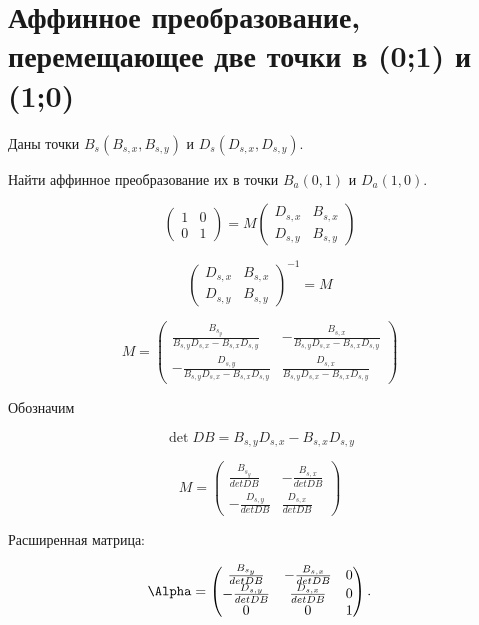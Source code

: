 \section{Аффинное преобразование, перемещающее две точки в (0;1) и (1;0)}

Даны точки $B_s(B_{s,x}, B_{s,y})$ и $D_s(D_{s,x}, D_{s,y})$.

Найти аффинное преобразование их в точки $B_a(0, 1)$ и $D_a(1, 0)$.

$$
\begin{pmatrix}
	1 & 0 \\
	0 & 1
\end{pmatrix}
= 
M
\begin{pmatrix}
	D_{s,x} & B_{s,x} \\
	D_{s,y} & B_{s,y}
\end{pmatrix}
$$

$$
\begin{pmatrix}
	D_{s,x} & B_{s,x} \\
	D_{s,y} & B_{s,y}
\end{pmatrix} ^ {-1}
= 
M
$$


$$
	M = 
	\begin{pmatrix}
		\frac{B_{s_y}}{B_{s,y} D_{s,x}-B_{s,x} D_{s,y}} & -\frac{B_{s,x}}{B_{s,y} D_{s,x}-B_{s,x} D_{s,y}}\\
		-\frac{D_{s,y}}{B_{s,y} D_{s,x}-B_{s,x} D_{s,y}} & \frac{D_{s,x}}{B_{s,y} D_{s,x}-B_{s,x} D_{s,y}}
	\end{pmatrix}
$$

Обозначим

$$ \det DB = B_{s,y} D_{s,x}-B_{s,x} D_{s,y}$$

$$
	M = 
	\begin{pmatrix}
		\frac{B_{s_y}}{det DB} & -\frac{B_{s,x}}{det DB}\\
		-\frac{D_{s,y}}{det DB} & \frac{D_{s,x}}{det DB}
	\end{pmatrix}
$$

Расширенная матрица:

$$
	\Alpha = 
	\begin{pmatrix}
		\frac{B_{s_y}}{det DB} & -\frac{B_{s,x}}{det DB} & 0 \\
		-\frac{D_{s,y}}{det DB} & \frac{D_{s,x}}{det DB} & 0 \\
		0 & 0 & 1
	\end{pmatrix}.
$$
